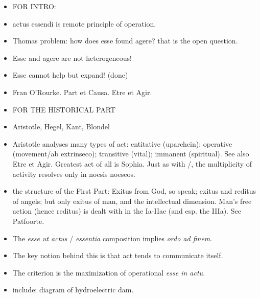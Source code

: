 \begin{DONE}

\begin{NOTES}
\begin{itemize}
  
  \item FOR INTRO:

  \item actus essendi is remote principle of operation.

  \item Thomas problem: how does esse found agere? that is the open question.

  \item Esse and agere are not heterogeneous!

  \item Esse cannot help but expand! (done)

  \item Fran O'Rourke. Part et Causa. Etre et Agir.

  \item FOR THE HISTORICAL PART

  \item Aristotle, Hegel, Kant, Blondel
  
  \item Aristotle analyses many types of act: entitative (uparchein); operative (movement/ab extrinseco); transitive (vital); immanent (spiritual). See also Etre et Agir. Greatest act of all is Sophia. Just as with /, the multiplicity of activity resolves only in noesis noeseos.

  \item the structure of the First Part: Exitus from God, so speak; exitus and reditus of angels; but only exitus of man, and the intellectual dimension. Man's free action (hence reditus) is dealt with in the Ia-IIae (and esp. the IIIa). See Patfoorte.



  \item The \emph{esse ut actus} / \emph{essentia} composition implies \emph{ordo ad finem}.
  
  \item The key notion behind this is that act tends to communicate itself.
  
  \item The criterion is the maximization of operational \emph{esse in actu}.
  
  \item include: diagram of hydroelectric dam.



\end{itemize}
\end{NOTES}
\end{DONE}
